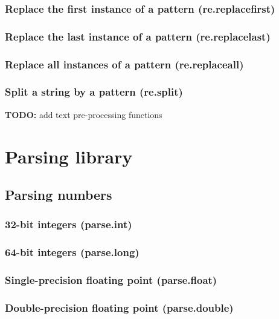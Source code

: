 \documentclass{article}
\theoremstyle{definition}
\begin{document}
\subsubsection{Replace the first instance of a pattern (re.replacefirst)}

\subsubsection{Replace the last instance of a pattern (re.replacelast)}

\subsubsection{Replace all instances of a pattern (re.replaceall)}

\subsubsection{Split a string by a pattern (re.split)}

{\bf TODO:} add text pre-processing functions

\pagebreak

\section{Parsing library}

\subsection{Parsing numbers}

\subsubsection{32-bit integers (parse.int)}

\subsubsection{64-bit integers (parse.long)}

\subsubsection{Single-precision floating point (parse.float)}

\subsubsection{Double-precision floating point (parse.double)}
\end{document}
